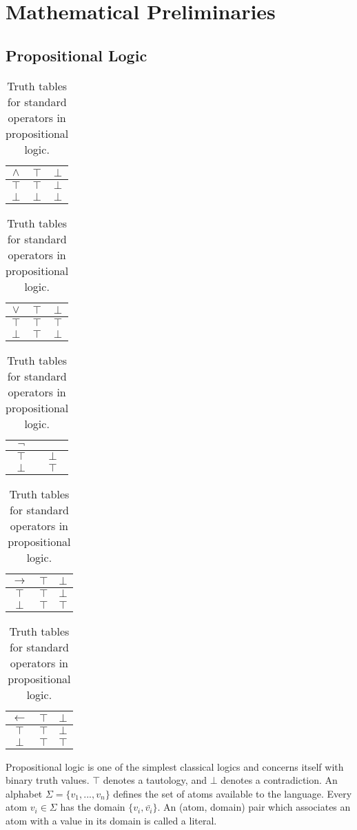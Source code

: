 \chapter{Mathematical Preliminaries}\label{chp:prelim} 
\section{Propositional Logic}

\begin{table}
\begin{center}


\begin{tabular}{ c | c c }
  $\land$& $\top$ & $\bot$ \\ \hline
 $\top$ & $\top$ & $\bot$ \\  
 $\bot$ & $\bot$ &  $\bot$
\end{tabular}
\quad
\begin{tabular}{ c | c c }
  $\lor$& $\top$ & $\bot$ \\ \hline
 $\top$ & $\top$ & $\top$ \\  
 $\bot$ & $\top$ &  $\bot$
\end{tabular}
\quad
\begin{tabular}{ c | c }
  $\lnot$& \\ \hline
 $\top$ & $\bot$ \\  
 $\bot$ & $\top$
\end{tabular}

\begin{tabular}{ c | c c }
  $\rightarrow$& $\top$ & $\bot$ \\ \hline
 $\top$ & $\top$ & $\bot$ \\  
 $\bot$ & $\top$ &  $\top$
\end{tabular}
\quad
\begin{tabular}{ c | c c }
  $\leftarrow$& $\top$ & $\bot$ \\ \hline
 $\top$ & $\top$ & $\bot$ \\  
 $\bot$ & $\top$ &  $\top$
\end{tabular}

\caption{Truth tables for standard operators in propositional logic.}
\label{tbl:prop}

\end{center}
\end{table}

Propositional logic is one of the simplest classical logics and concerns itself with binary truth values. $\top$ denotes a tautology, and $\bot$ denotes a contradiction. An alphabet $\Sigma=\{v_1,...,v_n\}$ defines the set of atoms available to the language. Every atom $v_i \in \Sigma$ has the domain $\{v_i, \bar{v_i}\}$. An (atom, domain) pair which associates an atom with a value in its domain is called a literal.

